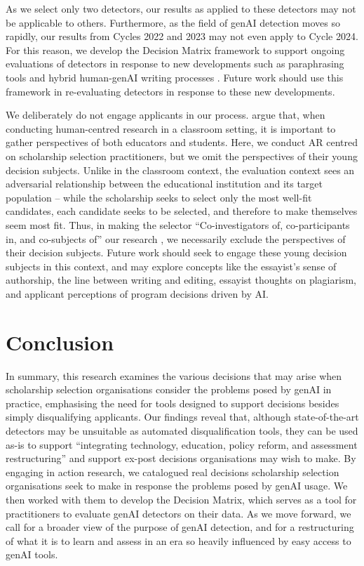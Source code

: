 As we select only two detectors, our results as applied to these detectors may not be applicable to others. Furthermore, as the field of genAI detection moves so rapidly, our results from Cycles 2022 and 2023 may not even apply to Cycle 2024. For this reason, we develop the Decision Matrix framework to support ongoing evaluations of detectors in response to new developments such as paraphrasing tools and hybrid human-genAI writing processes \cite{kalpesh_krishna_paraphrasing_2023}. Future work should use this framework in re-evaluating detectors in response to these new developments.

We deliberately do not engage applicants in our process. \textcite{Venn-Wycherley_Kharrufa_Lechelt_Nicholson_Howland_Almjally_Trory_Sarangapani_2024} argue that, when conducting human-centred research in a classroom setting, it is important to gather perspectives of both educators and students. Here, we conduct AR centred on scholarship selection practitioners, but we omit the perspectives of their young decision subjects. Unlike in the classroom context, the evaluation context sees an adversarial relationship between the educational institution and its target population – while the scholarship seeks to select only the most well-fit candidates, each candidate seeks to be selected, and therefore to make themselves seem most fit. Thus, in making the selector ``Co-investigators of, co-participants in, and co-subjects of'' our research \cite{Hayes_2011}, we necessarily exclude the perspectives of their decision subjects. Future work should seek to engage these young decision subjects in this context, and may explore concepts like the essayist's sense of authorship, the line between writing and editing, essayist thoughts on plagiarism, and applicant perceptions of program decisions driven by AI.

\section{Conclusion}
In summary, this research examines the various decisions that may arise when scholarship selection organisations consider the problems posed by genAI in practice, emphasising the need for tools designed to support decisions besides simply disqualifying applicants. Our findings reveal that, although state-of-the-art detectors may be unsuitable as automated disqualification tools, they can be used as-is to support ``integrating technology, education, policy reform, and assessment restructuring'' \cite{mike_perkins_decoding_2023} and support ex-post decisions organisations may wish to make. By engaging in action research, we catalogued real decisions scholarship selection organisations seek to make in response the problems posed by genAI usage. We then worked with them to develop the Decision Matrix, which serves as a tool for practitioners to evaluate genAI detectors on their data. As we move forward, we call for a broader view of the purpose of genAI detection, and for a restructuring of what it is to learn and assess in an era so heavily influenced by easy access to genAI tools.